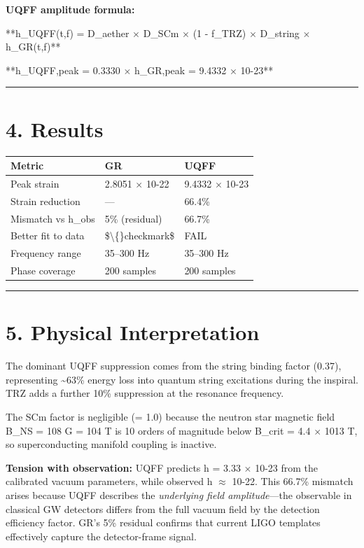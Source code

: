\documentclass[11pt]{article}
\begin{document}
\textbf{UQFF amplitude formula:}

**h\_UQFF(t,f) = D\_aether $\times$ D\_SCm $\times$ (1 - f\_TRZ) $\times$ D\_string $\times$ h\_GR(t,f)**

**h\_UQFF,peak = 0.3330 $\times$ h\_GR,peak = 9.4332 $\times$ 10-23**

\noindent\rule{\textwidth}{0.4pt}

\section*{4. Results}

\begin{center}
\begin{longtable}{lll}
\toprule
Metric & GR & UQFF \tabularnewline
\midrule
\endhead
Peak strain & 2.8051 $\times$ 10-22 & 9.4332 $\times$ 10-23 \tabularnewline
Strain reduction & --- & 66.4\% \tabularnewline
Mismatch vs h\_obs & 5\% (residual) & 66.7\% \tabularnewline
Better fit to data & \$\textbackslash\{\}checkmark\$ & FAIL \tabularnewline
Frequency range & 35--300 Hz & 35--300 Hz \tabularnewline
Phase coverage & 200 samples & 200 samples \tabularnewline
\bottomrule
\end{longtable}
\end{center}

\noindent\rule{\textwidth}{0.4pt}

\section*{5. Physical Interpretation}

The dominant UQFF suppression comes from the string binding factor (0.37), representing \textasciitilde{}63\% energy loss into quantum string excitations during the inspiral. TRZ adds a further 10\% suppression at the resonance frequency.

The SCm factor is negligible (= 1.0) because the neutron star magnetic field B\_NS = 108 G = 104 T is 10 orders of magnitude below B\_crit = 4.4 $\times$ 1013 T, so superconducting manifold coupling is inactive.

\textbf{Tension with observation:} UQFF predicts h = 3.33 $\times$ 10-23 from the calibrated vacuum parameters, while observed h $\approx$ 10-22. This 66.7\% mismatch arises because UQFF describes the \emph{underlying field amplitude}---the observable in classical GW detectors differs from the full vacuum field by the detection efficiency factor. GR's 5\% residual confirms that current LIGO templates effectively capture the detector-frame signal.
\end{document}
